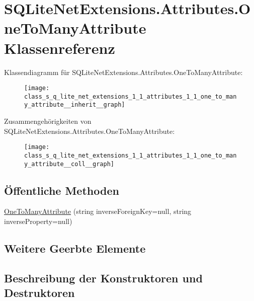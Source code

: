 \hypertarget{class_s_q_lite_net_extensions_1_1_attributes_1_1_one_to_many_attribute}{}\section{S\+Q\+Lite\+Net\+Extensions.\+Attributes.\+One\+To\+Many\+Attribute Klassenreferenz}
\label{class_s_q_lite_net_extensions_1_1_attributes_1_1_one_to_many_attribute}


Klassendiagramm für S\+Q\+Lite\+Net\+Extensions.\+Attributes.\+One\+To\+Many\+Attribute\+:\nopagebreak
\begin{figure}[H]
\begin{center}
\leavevmode
\texttt{[image: class\_s\_q\_lite\_net\_extensions\_1\_1\_attributes\_1\_1\_one\_to\_many\_attribute\_\_inherit\_\_graph]}
\end{center}
\end{figure}


Zusammengehörigkeiten von S\+Q\+Lite\+Net\+Extensions.\+Attributes.\+One\+To\+Many\+Attribute\+:\nopagebreak
\begin{figure}[H]
\begin{center}
\leavevmode
\texttt{[image: class\_s\_q\_lite\_net\_extensions\_1\_1\_attributes\_1\_1\_one\_to\_many\_attribute\_\_coll\_\_graph]}
\end{center}
\end{figure}
\subsection*{Öffentliche Methoden}
\begin{DoxyCompactItemize}
\item 
\mbox{\hyperlink{class_s_q_lite_net_extensions_1_1_attributes_1_1_one_to_many_attribute_a2650f521d9866745f2b8df4310975050}{One\+To\+Many\+Attribute}} (string inverse\+Foreign\+Key=null, string inverse\+Property=null)
\end{DoxyCompactItemize}
\subsection*{Weitere Geerbte Elemente}


\subsection{Beschreibung der Konstruktoren und Destruktoren}
\mbox{\label{class_s_q_lite_net_extensions_1_1_attributes_1_1_one_to_many_attribute_a2650f521d9866745f2b8df4310975050}} 
